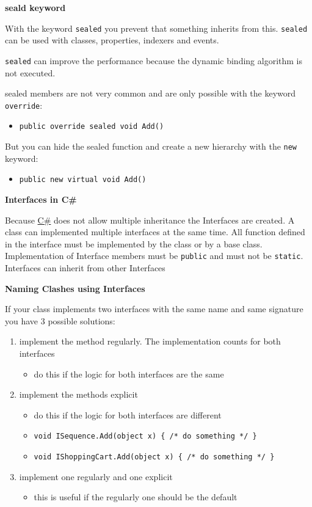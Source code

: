 \documentclass[11pt,twoside,landscape]{article}
\begin{document}
\begin{multicols}{3}
\textbf{seald keyword}

With the keyword \texttt{sealed} you prevent that something inherits from this.
\texttt{sealed} can be used with classes, properties, indexers and events.

\texttt{sealed} can improve the performance because the dynamic binding algorithm is not executed.

sealed members are not very common and are only possible with the keyword \texttt{override}:
\begin{itemize}
\item \texttt{public override sealed void Add()}
\end{itemize}


But you can hide the sealed function and create a new hierarchy with the \texttt{new} keyword:
\begin{itemize}
\item \texttt{public new virtual void Add()}
\end{itemize}


\textbf{Interfaces in C\#}

Because \href{../../../roam/20211003114158-c.org}{C\#} does not allow multiple inheritance the Interfaces are created.
A class can implemented multiple interfaces at the same time.
All function defined in the interface must be implemented by the class or by a base class.
Implementation of Interface members must be \texttt{public} and must not be \texttt{static}.
Interfaces can inherit from other Interfaces

\textbf{Naming Clashes using Interfaces}

If your class implements two interfaces with the same name and same signature you have 3 possible solutions:
\begin{enumerate}
\item implement the method regularly.
The implementation counts for both interfaces
\begin{itemize}
\item do this if the logic for both interfaces are the same
\end{itemize}
\item implement the methods explicit
\begin{itemize}
\item do this if the logic for both interfaces are different
\item \texttt{void ISequence.Add(object x) \{ /* do something */ \}}
\item \texttt{void IShoppingCart.Add(object x) \{ /* do something */ \}}
\end{itemize}
\item implement one regularly and one explicit
\begin{itemize}
\item this is useful if the regularly one should be the default
\end{itemize}
\end{enumerate}


\end{multicols}
\end{document}
